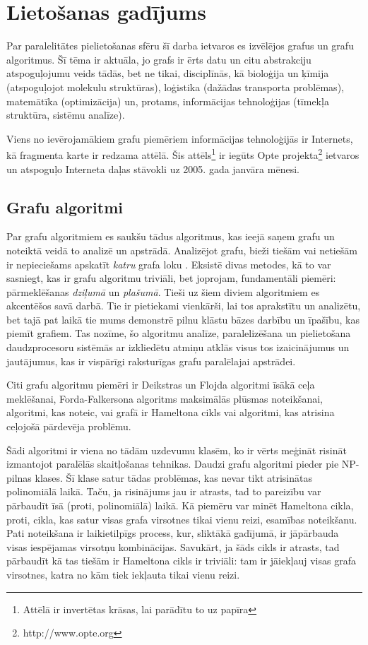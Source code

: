 \section{Lietošanas gadījums}
Par paralelitātes pielietošanas sfēru šī darba ietvaros es izvēlējos grafus un
grafu algoritmus. Šī tēma ir aktuāla, jo grafs ir ērts datu un citu abstrakciju
atspoguļojumu veids tādās, bet ne tikai, disciplīnās, kā bioloģija un ķīmija
(atspoguļojot molekulu struktūras), loģistika (dažādas transporta problēmas),
matemātīka (optimizācija) un, protams, informācijas tehnoloģijas (tīmekļa struktūra,
sistēmu analīze).

Viens no ievērojamākiem grafu piemēriem informācijas tehnoloģijās
ir Internets, kā fragmenta karte ir redzama  attēlā. Šis
attēls\footnote{Attēlā ir invertētas krāsas, lai parādītu to uz papīra}
ir iegūts Opte projekta\footnote{http://www.opte.org} ietvaros un atspoguļo Interneta
daļas stāvokli uz 2005. gada janvāra mēnesi.


\subsection{Grafu algoritmi}
Par grafu algoritmiem es saukšu tādus algoritmus, kas ieejā saņem grafu un noteiktā
veidā to analizē un apstrādā. Analizējot grafu, bieži tiešām vai netiešām ir
nepieciešams apskatīt \emph{katru} grafa loku . Eksistē divas metodes, kā to var
sasniegt, kas ir grafu algoritmu triviāli, bet joprojam, fundamentāli piemēri:
pārmeklēšanas \emph{dziļumā} un \emph{plašumā}. Tieši uz šiem diviem algoritmiem es
akcentēšos savā darbā. Tie ir pietiekami vienkārši, lai tos aprakstītu un analizētu,
bet tajā pat laikā tie mums demonstrē pilnu klāstu bāzes darbību un īpašību, kas
piemīt grafiem. Tas nozīme, šo algoritmu analīze, paralelizēšana un pielietošana
daudzprocesoru sistēmās ar izkliedētu atmiņu atklās visus tos izaicinājumus un
jautājumus, kas ir vispārīgi raksturīgas grafu paralēlajai apstrādei.

Citi grafu algoritmu piemēri ir Deikstras un Flojda algoritmi īsākā ceļa meklēšanai,
Forda-Falkersona algoritms maksimālās plūsmas noteikšanai, algoritmi, kas noteic,
vai grafā ir Hameltona cikls vai algoritmi, kas atrisina ceļojošā pārdevēja problēmu.

Šādi algoritmi ir viena no tādām uzdevumu klasēm, ko ir vērts meģināt risināt izmantojot
paralēlās skaitļošanas tehnikas. Daudzi grafu algoritmi pieder pie NP-pilnas klases.
Šī klase satur tādas problēmas, kas nevar tikt atrisinātas polinomiālā laikā. Taču, ja
risinājums jau ir atrasts, tad to pareizību var pārbaudīt īsā (proti, polinomiālā)
laikā. Kā piemēru var minēt Hameltona cikla, proti, cikla, kas satur visas grafa
virsotnes tikai vienu reizi, esamības noteikšanu. Pati noteikšana ir laikietilpīgs
process, kur, sliktākā gadījumā, ir jāpārbauda visas iespējamas virsotņu kombinācijas.
Savukārt, ja šāds cikls ir atrasts, tad pārbaudīt kā tas tiešām ir Hameltona cikls
ir triviāli: tam ir jāiekļauj visas grafa virsotnes, katra no kām tiek iekļauta
tikai vienu reizi.

